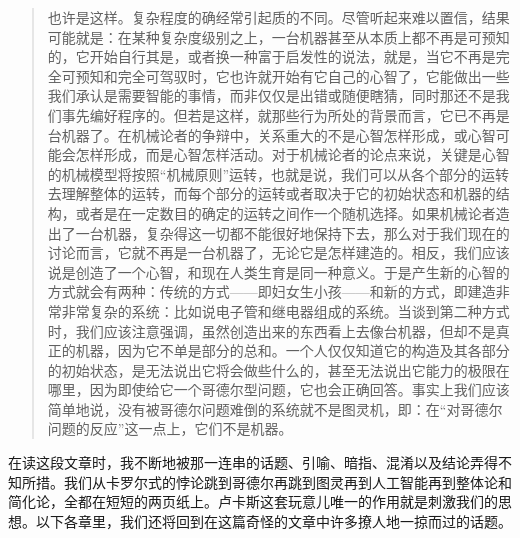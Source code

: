 \begin{quote}
也许是这样。复杂程度的确经常引起质的不同。尽管听起来难以置信，结果可能就是：在某种复杂度级别之上，一台机器甚至从本质上都不再是可预知的，它开始自行其是，或者换一种富于启发性的说法，就是，当它不再是完全可预知和完全可驾驭时，它也许就开始有它自己的心智了，它能做出一些我们承认是需要智能的事情，而非仅仅是出错或随便瞎猜，同时那还不是我们事先编好程序的。但若是这样，就那些行为所处的背景而言，它已不再是台机器了。在机械论者的争辩中，关系重大的不是心智怎样形成，或心智可能会怎样形成，而是心智怎样活动。对于机械论者的论点来说，关键是心智的机械模型将按照“机械原则”运转，也就是说，我们可以从各个部分的运转去理解整体的运转，而每个部分的运转或者取决于它的初始状态和机器的结构，或者是在一定数目的确定的运转之间作一个随机选择。如果机械论者造出了一台机器，复杂得这一切都不能很好地保持下去，那么对于我们现在的讨论而言，它就不再是一台机器了，无论它是怎样建造的。相反，我们应该说是创造了一个心智，和现在人类生育是同一种意义。于是产生新的心智的方式就会有两种：传统的方式——即妇女生小孩——和新的方式，即建造非常非常复杂的系统：比如说电子管和继电器组成的系统。当谈到第二种方式时，我们应该注意强调，虽然创造出来的东西看上去像台机器，但却不是真正的机器，因为它不单是部分的总和。一个人仅仅知道它的构造及其各部分的初始状态，是无法说出它将会做些什么的，甚至无法说出它能力的极限在哪里，因为即使给它一个哥德尔型问题，它也会正确回答。事实上我们应该简单地说，没有被哥德尔问题难倒的系统就不是图灵机，即：在“对哥德尔问题的反应”这一点上，它们不是机器。
\end{quote}

在读这段文章时，我不断地被那一连串的话题、引喻、暗指、混淆以及结论弄得不知所措。我们从卡罗尔式的悖论跳到哥德尔再跳到图灵再到人工智能再到整体论和简化论，全都在短短的两页纸上。卢卡斯这套玩意儿唯一的作用就是刺激我们的思想。以下各章里，我们还将回到在这篇奇怪的文章中许多撩人地一掠而过的话题。


